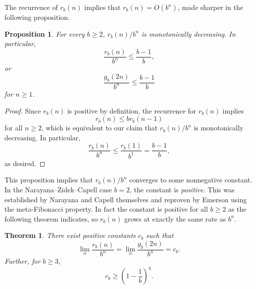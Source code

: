 \documentclass[12pt]{article}
\newtheorem{theorem}{Theorem}
\newtheorem{proposition}{Proposition}
\theoremstyle{definition}
\begin{document}
The recurrence of $r_b(n)$ implies that $r_b(n) = O(b^n)$, made sharper in the
following proposition.

\begin{proposition}
    \label{monotone}
    For every $b \geq 2$, $r_b(n) / b^n$ is monotonically decreasing. In
    particular,
    \begin{equation*}
        \frac{r_b(n)}{b^n} \leq \frac{b - 1}{b},
    \end{equation*}
    or
    \begin{equation*}
        \frac{g_b(2n)}{b^n} \leq \frac{b - 1}{b}
    \end{equation*}
    for $n \geq 1$.
\end{proposition}

\begin{proof}
    Since $r_b(n)$ is positive by definition, the recurrence for $r_b(n)$
    implies
    \begin{equation*}
        r_b(n) \leq b r_b(n - 1)
    \end{equation*}
    for all $n \geq 2$, which is equivalent to our claim that $r_b(n) / b^n$
    is monotonically decreasing. In particular,
    \begin{equation*}
        \frac{r_b(n)}{b^n} \leq \frac{r_b(1)}{b^1} = \frac{b - 1}{b},
    \end{equation*}
    as desired.
\end{proof}

This proposition implies that $r_b(n) / b^n$ converges to some nonnegative
constant. In the Narayana--Zidek--Capell case $b = 2$, the constant is
\emph{positive}. This was established by Narayana and Capell themselves
\cite{capell1970knock} and reproven by Emerson \cite{emerson2006family} using
the meta-Fibonacci property. In fact the constant is positive for all $b \geq
2$ as the following theorem indicates, so $r_b(n)$ grows at exactly the same
rate as $b^n$. 

\begin{theorem}
    There exist positive constants $c_b$ such that
    \begin{equation*}
        \lim_n \frac{r_b(n)}{b^n} = \lim_n \frac{g_b(2n)}{b^n} = c_b.
    \end{equation*}
    Further, for $b \geq 3$,
    \begin{equation*}
        c_b \geq \left(1 - \frac{1}{b}\right)^4.
    \end{equation*}
\end{theorem}
\end{document}
